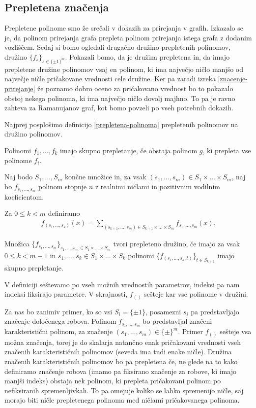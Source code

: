 \subsection{Prepletena značenja}
Prepletene polinome smo že srečali v dokazih za prirejanja v grafih. Izkazalo se je, da polinom prirejanja grafa prepleta polinom prirejanja istega grafa z dodanim vozliščem. Sedaj si bomo ogledali drugačno družino prepletenih polinomov, družino \(\{f_s\}_{s\in \{\pm 1\}^m}\). Pokazali bomo, da je družina prepletena in, da imajo prepletene družine polinomov vsaj en polinom, ki ima največjo ničlo manjšo od največje ničle pričakovane vrednosti cele družine. Ker pa zaradi izreka \ref{znacenje-prirejanje} že poznamo dobro oceno za pričakovano vrednost bo to pokazalo obstoj nekega polinoma, ki ima največjo ničlo dovolj majhno. To pa je ravno zahteva za Ramanujanov graf, kot bomo povzeli po vseh potrebnih dokazih.

Najprej posplošimo definicijo \ref{prepletena-polinoma} prepletenih polinomov na družino polinomov.
\begin{definicija}
    Polinomi \(f_1, \ldots, f_k\) imajo skupno prepletanje, če obstaja polinom \(g\), ki prepleta vse polinome \(f_i\).
\end{definicija}
\begin{definicija}\label{prepletena-druzina}
    Naj bodo \(S_1, \ldots, S_m\) končne množice in, za vsak \((s_1, \ldots, s_m)\in S_1\times \ldots \times S_m\), naj bo \(f_{s_1, \ldots, s_m}\) polinom stopnje \(n\) z realnimi ničlami in pozitivnim vodilnim koeficientom.

    Za \(0\leq k<m\) definiramo
    \begin{align*}
        f_{(s_1, \ldots, s_k)}(x) = \sum_{(s_{k+1}, \ldots, s_m)\in S_{k+1}\times \ldots \times S_m} f_{s_1, \ldots, s_m}(x).
    \end{align*}

    Množica \(\{f_{s_1,\ldots, s_m}\}_{s_1,\ldots, s_m\in S_1\times \ldots \times S_m}\) tvori prepleteno družino, če imajo za vsak \(0\leq k<m-1\) in \(s_1, \ldots, s_k\in S_1\times \ldots \times S_k\) polinomi \(\{f_{(s_1, \ldots, s_k, t)}\}_{t\in S_{k+1}}\) imajo skupno prepletanje.
\end{definicija}
V definiciji seštevamo po vseh možnih vrednostih parametrov, indeksi pa nam indeksi fiksirajo parametre. V skrajnosti, \(f_{()}\) sešteje kar vse polinome v družini.

Za nas bo zanimiv primer, ko so vsi \(S_i=\{\pm 1\}\), posamezni \(s_i\) pa predstavljajo značenje določenega robova. Polinom \(f_{s_1, \ldots, s_m}\) bo predstavljal značeni karakteristični polinom, za značenje \((s_1,\ldots, s_m) \in \{\pm\}^m\). Primer \(f_{()}\) sešteje vsa možna značenja, torej je do skalarja natančno enak pričakovani vrednosti vseh značenih karakterističnih polinomov (seveda ima tudi enake ničle). Družina značenih karakterističnih polinomov bo pa prepletena če, ne glede na to kako definiramo značenje robova (imamo pa fiksirano značenje za robove, ki imajo manjši indeks) obstaja nek polinom, ki prepleta pričakovani polinom po nefiksiranih spremenljivkah. To pa omejuje koliko se lahko spremenijo ničle, saj morajo biti ničle prepletenega polinoma med ničlami pričakovanega polinoma.

